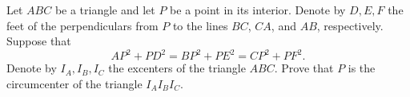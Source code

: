 Let $ABC$ be a triangle and let $P$ be a point in its interior. Denote by $D, E, F$ the feet of the perpendiculars from $P$ to the lines $BC$, $CA$, and $AB$, respectively. Suppose that
\[
AP^2 + PD^2 = BP^2 + PE^2 = CP^2 + PF^2.
\]
Denote by $I_A, I_B, I_C$ the excenters of the triangle $ABC$. Prove that $P$ is the circumcenter of the triangle $I_A I_B I_C$.
